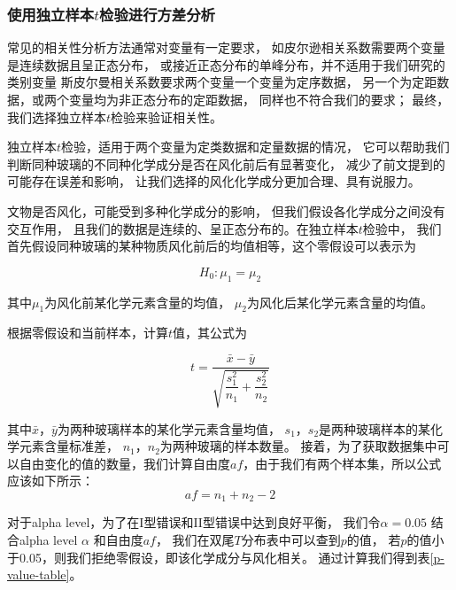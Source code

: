 \documentclass[withoutpreface,bwprint]{cumcmthesis} %
\begin{document}
\subsubsection{使用独立样本$t$检验进行方差分析}
常见的相关性分析方法通常对变量有一定要求，
如皮尔逊相关系数需要两个变量是连续数据且呈正态分布，
或接近正态分布的单峰分布，并不适用于我们研究的类别变量
斯皮尔曼相关系数要求两个变量一个变量为定序数据，
另一个为定距数据，或两个变量均为非正态分布的定距数据，
同样也不符合我们的要求；
最终，我们选择独立样本$t$检验来验证相关性。

独立样本$t$检验，适用于两个变量为定类数据和定量数据的情况，
它可以帮助我们判断同种玻璃的不同种化学成分是否在风化前后有显著变化，
减少了前文提到的可能存在误差和影响，
让我们选择的风化化学成分更加合理、具有说服力。

文物是否风化，可能受到多种化学成分的影响，
但我们假设各化学成分之间没有交互作用，
且我们的数据是连续的、呈正态分布的。在独立样本$t$检验中，
我们首先假设同种玻璃的某种物质风化前后的均值相等，这个零假设可以表示为

\begin{equation}
	H_0: \mu_{1} = \mu_{2}
\end{equation}

其中$\mu_{1}$为风化前某化学元素含量的均值，
$\mu_{2}$为风化后某化学元素含量的均值。

根据零假设和当前样本，计算$t$值，其公式为

\begin{equation}
	t = \dfrac{\bar{x} - \bar{y}}{\sqrt{\dfrac{s^2_1}{n_1} + \dfrac{s^2_2}{n_2}}}
\end{equation}

其中$\bar{x}$，$\bar{y}$为两种玻璃样本的某化学元素含量均值，
$s_1$，$s_2$是两种玻璃样本的某化学元素含量标准差，
$n_1$，$n_2$为两种玻璃的样本数量。
接着，为了获取数据集中可以自由变化的值的数量，我们计算自由度$af$，由于我们有两个样本集，所以公式应该如下所示：
\begin{equation}
	af=n_1 +n_2 - 2
\end{equation}

对于alpha level，为了在I型错误和II型错误中达到良好平衡，
我们令$\alpha=0.05$
结合alpha level $\alpha$ 和自由度$af$，
我们在双尾$T$分布表中可以查到$p$的值，
若$p$的值小于0.05，则我们拒绝零假设，即该化学成分与风化相关。
通过计算我们得到表\ref{p-value-table}。
\end{document}
